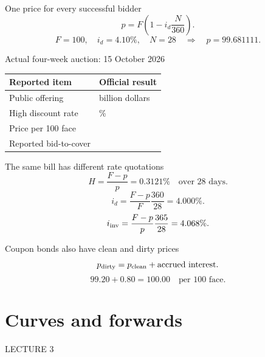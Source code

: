 \documentclass[12pt,aspectratio=169]{beamer}
\begin{document}

\begin{frame}{One price for every successful bidder}
\[p=F\left(1-i_d\frac{N}{360}\right).\]\[F=100,\quad i_d=4.10\%,\quad N=28\quad\Rightarrow\quad p=99.681111.\]
\end{frame}


\begin{frame}{Actual four-week auction: 15 October 2026}
\begin{center}\begin{tabular}{@{}>{\raggedright\arraybackslash}p{}>{\raggedright\arraybackslash}p{}@{}}\toprule \textbf{Reported item} & \textbf{Official result}\\\midrule Public offering & 110 billion dollars\\[2mm]
High discount rate & 4.000\%\\[2mm]
Price per 100 face & 99.688889\\[2mm]
Reported bid-to-cover & 2.56\\\bottomrule\end{tabular}\end{center}
\end{frame}


\begin{frame}{The same bill has different rate quotations}
\[H=\frac{F-p}{p}=0.3121\%\quad\text{over 28 days}.\]\[i_d=\frac{F-p}{F}\frac{360}{28}=4.000\%.\]\[i_{\rm inv}=\frac{F-p}{p}\frac{365}{28}=4.068\%.\]
\end{frame}


\begin{frame}{Coupon bonds also have clean and dirty prices}
\[p_{\rm dirty}=p_{\rm clean}+\text{accrued interest}.\]\[99.20+0.80=100.00\quad\text{per 100 face}.\]
\end{frame}

\section[Curves and forwards]{Curves and forwards}
\begin{frame}[plain]
{\color{Gold}\large LECTURE 3}\par\vspace{9mm}{\Huge\bfseries Curves and forwards}\par\vspace{7mm}{\Large What do prices at different maturities let us lock in?}
\end{frame}
\end{document}
